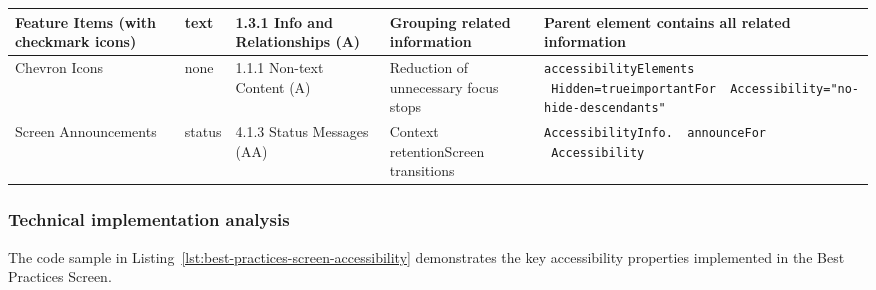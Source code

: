 \begin{longtable}{|p{2.5cm}|p{2cm}|p{2.8cm}|p{2.8cm}|p{4.3cm}|}
\hline
Feature Items (with checkmark icons) & text & 1.3.1 Info and Relationships (A) & Grouping related information & Parent element contains all related information \\
\hline
Chevron Icons & none & 1.1.1 Non-text Content (A) & Reduction of unnecessary focus stops & \texttt{accessibilityElements \ Hidden=true}\newline \texttt{importantFor \ Accessibility="no-hide-descendants"} \\
\hline
Screen Announcements & status & 4.1.3 Status Messages (AA) & Context retention\newline Screen transitions & \texttt{AccessibilityInfo. \ announceFor \ Accessibility} \\
\end{longtable}

\subsubsection{Technical implementation analysis}

The code sample in Listing~\ref{lst:best-practices-screen-accessibility} demonstrates the key accessibility properties implemented in the Best Practices Screen.

